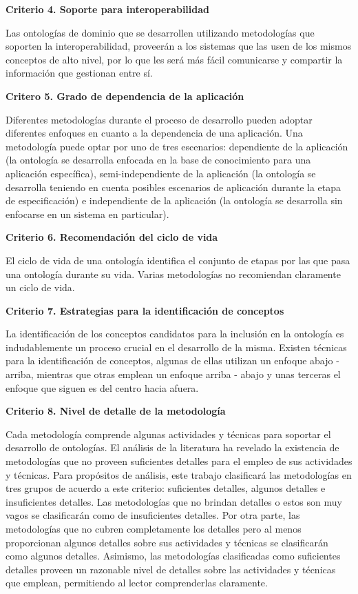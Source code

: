 \textbf{Criterio 4. Soporte para interoperabilidad}

Las ontologías de dominio que se desarrollen utilizando metodologías que soporten la interoperabilidad, proveerán a los sistemas que las usen de los mismos conceptos de alto nivel, por lo que les será más fácil comunicarse y compartir la información que gestionan entre sí.

\textbf{Critero 5. Grado de dependencia de la aplicación}

Diferentes metodologías durante el proceso de desarrollo pueden adoptar diferentes enfoques en cuanto a la dependencia de una aplicación. Una metodología puede optar por uno de tres escenarios: dependiente de la aplicación (la ontología se desarrolla enfocada en la base de conocimiento para una aplicación específica), semi-independiente de la aplicación (la ontología se desarrolla teniendo en cuenta posibles escenarios de aplicación durante la etapa de especificación) e independiente de la aplicación (la ontología se desarrolla sin enfocarse en un sistema en particular).

\textbf{Criterio 6. Recomendación del ciclo de vida}

El ciclo de vida de una ontología identifica el conjunto de etapas por las que pasa una ontología durante su vida. Varias metodologías no recomiendan claramente un ciclo de vida.

\textbf{Criterio 7. Estrategias para la identificación de conceptos}

La identificación de los conceptos candidatos para la inclusión en la ontología es indudablemente un proceso crucial en el desarrollo de la misma. Existen técnicas para la identificación de conceptos, algunas de ellas utilizan un enfoque abajo - arriba, mientras que otras emplean un enfoque arriba - abajo y unas terceras el enfoque que siguen es del centro hacia afuera.

\textbf{Criterio 8. Nivel de detalle de la metodología}

Cada metodología comprende algunas actividades y técnicas para soportar el desarrollo de ontologías. El análisis de la literatura ha revelado la existencia de metodologías que no proveen suficientes detalles para el empleo de sus actividades y técnicas. Para propósitos de análisis, este trabajo clasificará las metodologías en tres grupos de acuerdo a este criterio: suficientes detalles, algunos detalles e insuficientes detalles. Las metodologías que no brindan detalles o estos son muy vagos se clasificarán como de insuficientes detalles. Por otra parte, las metodologías que no cubren completamente los detalles pero al menos proporcionan algunos detalles sobre sus actividades y técnicas se clasificarán como algunos detalles. Asimismo, las metodologías clasificadas como suficientes detalles proveen un razonable nivel de detalles sobre las actividades y técnicas que emplean, permitiendo al lector comprenderlas claramente. 

